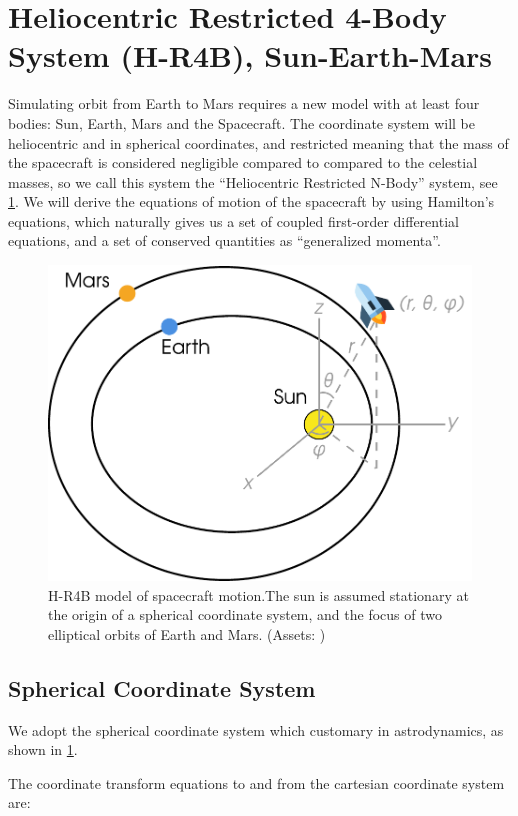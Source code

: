 \section{Heliocentric Restricted 4-Body System (H-R4B), Sun-Earth-Mars}
Simulating orbit from Earth to Mars requires a new model with at least four bodies: Sun, Earth, Mars and the Spacecraft. The coordinate system will be heliocentric and in spherical coordinates, and restricted meaning that the mass of the spacecraft is considered negligible compared to compared to the celestial masses, so we call this system the ``Heliocentric Restricted N-Body'' system, see \cref{fig:solar-system-model}. We will derive the equations of motion of the spacecraft by using Hamilton's equations, which naturally gives us a set of coupled first-order differential equations, and a set of conserved quantities as ``generalized momenta''.

\begin{figure}[ht]
    \centering
    \includegraphics[width=0.80\linewidth]{fig/solar-system-model}
    \caption{ H-R4B model of spacecraft motion.The sun is assumed stationary at the origin of a spherical coordinate system, and the focus of two elliptical orbits of Earth and Mars. (Assets: \cite{WikiSpherical,flaticon})}
    \label{fig:solar-system-model}
\end{figure}

\subsection{Spherical Coordinate System}
We adopt the spherical coordinate system which customary in astrodynamics, as shown in \cref{fig:solar-system-model}.

The coordinate transform equations to and from the cartesian coordinate system are:

